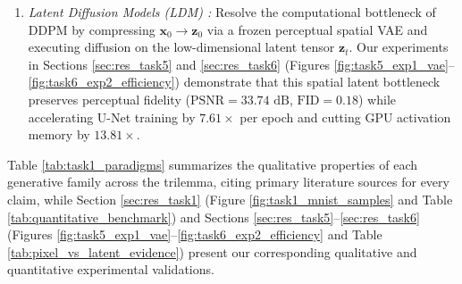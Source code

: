 \documentclass[10pt,a4paper]{article}
\begin{document}
\begin{enumerate}[leftmargin=1.8em, itemsep=0.3em]
    \item \textit{Latent Diffusion Models (LDM) \cite{rombach2022high}:} Resolve the computational bottleneck of DDPM by compressing $\mathbf{x}_0 \to \mathbf{z}_0$ via a frozen perceptual spatial VAE and executing diffusion on the low-dimensional latent tensor $\mathbf{z}_t$. Our experiments in Sections \ref{sec:res_task5} and \ref{sec:res_task6} (Figures \ref{fig:task5_exp1_vae}--\ref{fig:task6_exp2_efficiency}) demonstrate that this spatial latent bottleneck preserves perceptual fidelity ($\text{PSNR} = 33.74\text{ dB}$, $\text{FID} = 0.18$) while accelerating U-Net training by $7.61\times$ per epoch and cutting GPU activation memory by $13.81\times$.
\end{enumerate}

Table \ref{tab:task1_paradigms} summarizes the qualitative properties of each generative family across the trilemma, citing primary literature sources for every claim, while Section \ref{sec:res_task1} (Figure \ref{fig:task1_mnist_samples} and Table \ref{tab:quantitative_benchmark}) and Sections \ref{sec:res_task5}--\ref{sec:res_task6} (Figures \ref{fig:task5_exp1_vae}--\ref{fig:task6_exp2_efficiency} and Table \ref{tab:pixel_vs_latent_evidence}) present our corresponding qualitative and quantitative experimental validations.
\end{document}
